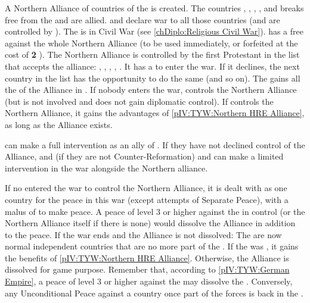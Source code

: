 
\phevnt
\aparag A Northern Alliance of countries of the \HRE is created.  The
countries \paysOldenburg, \paysHanovre, \paysHesse, \paysHanse, and \paysBerg
breaks free from the \GE and are allied.
\aparag \GE and \hab declare war to all those countries (and are controlled by
\SPA). The \GE is in Civil War (see \ref{chDiplo:Religious Civil War}).
\bparag \AUS has a free \CB against the whole Northern Alliance (to be used
immediately, or forfeited at the cost of {\bf 2} \STAB).
\aparag The Northern Alliance is controlled by the first Protestant \MAJ in
the list that accepts the alliance: \HOL, \ENG, \SUE, \FRA, \POL.  It has a
\CB to enter the war. If it declines, the next country in the list has the
opportunity to do the same (and so on).  The \MAJ gains all the \MIN of the
Alliance in \EG.  If nobody enters the war, \SUE controls the Northern
Alliance (but is not involved and does not gain diplomatic control).
\aparag If \HOL controls the Northern Alliance, it gains the advantages of
\ref{pIV:TYW:Northern HRE Alliance}, as long as the Alliance exists.

\phdipl
\aparag \SPA can make a full intervention as an ally of \HAB.
\aparag If they have not declined control of the Alliance, \FRA and \ENG (if
they are not Counter-Reformation) and \SUE can make a limited intervention in
the war alongside the Northern alliance.

\phpaix
\aparag If no \MAJ entered the war to control the Northern Alliance, it is
dealt with as one country for the peace in this war (except attempts of
Separate Peace), with a malus of  to make peace.
\aparag A peace of level 3 or higher against the \MAJ in control (or the
Northern Alliance itself if there is none) would dissolve the Alliance in
addition to the peace.
\aparag If the war ends and the Alliance is not dissolved:
\bparag The \MIN are now normal independent countries that are no more part of
the \GE.
\bparag If the \MAJ was \HOL, it gains the benefits of \ref{pIV:TYW:Northern
  HRE Alliance}. Otherwise, the Alliance is dissolved for game purpose.
\aparag Remember that, according to \ref{pIV:TYW:German Empire}, a peace of
level 3 or higher against the \MAJHAB may dissolve the \GE.  Conversely, any
Unconditional Peace against a country once part of the \GE forces is back in
the \GE.



